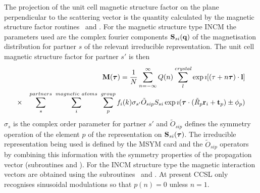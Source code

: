 The projection of the unit cell magnetic structure factor on the plane perpendicular to the scattering vector is
the  quantity calculated by the magnetic structure factor routines 
\ and .
\p
For the magnetic structure type INCM the parameters used are the complex fourier components $\mbox{${\bf S}$}_{si}({\bf q})$ of the 
 magnetisation distribution for partner $s$ of the relevant irreducible representation. The unit cell magnetic structure factor for partner $s'$ is 
 then
\begin{eqnarray*}&&\Mv(\pv)=\frac1N \sum_{n=-\infty}^\infty Q(n) \sum_l^{\mathit{crystal}}
\exp \imath[(\kv+n\pv)\cdot\lat]\\
\times&&\sum^{partners}_{s}\ \sum^{magnetic\ atoms}_{i}\ \sum^{group}_{p}f_i(k)\sigma_{s'} \tilde {O}_{sip}S_{si}\exp\imath(\pv\cdot(\tilde R_p\rv_i+{\bf t}_p)\pm\phi_{p})
\end{eqnarray*}
$\sigma_s$ is the complex order parameter for partner $s'$ and $\tilde {O}_{sip}$ defines 
the symmetry operation
of the element $p$ of the representation on $\mbox{${\bf S}$}_{si}({\bm \tau})$. The irreducible representation  being used is
 defined by the MSYM card and the  $\tilde {O}_{sip}$ operators by combining this information with the 
 symmetry properties of the propagation vector (subroutines  and ). 
For the INCM structure type the magnetic interaction vectors are obtained using  the subroutines
\ and .
\p
At
present CCSL only recognises sinusoidal modulations so that $p(n)=0$ unless
$n=1$. 
\
%
